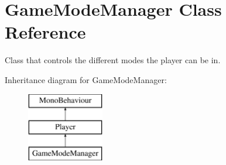 \hypertarget{class_game_mode_manager}{}\section{Game\+Mode\+Manager Class Reference}
\label{class_game_mode_manager}


Class that controls the different modes the player can be in.  


Inheritance diagram for Game\+Mode\+Manager\+:\begin{figure}[H]
\begin{center}
\leavevmode
\includegraphics[height=3.000000cm]{class_game_mode_manager}
\end{center}
\end{figure}

